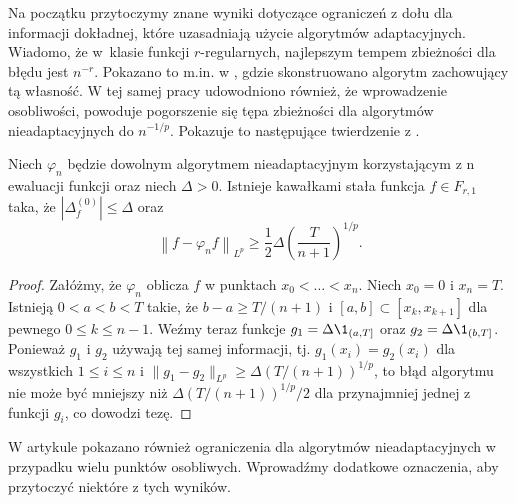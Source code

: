 \documentclass[oik, pdftex, man]{mgrwms}
\begin{document}
    Na początku przytoczymy znane wyniki dotyczące ograniczeń z dołu dla informacji dokładnej, które uzasadniają użycie algorytmów adaptacyjnych. Wiadomo, że w~klasie funkcji $r$-regularnych, najlepszym tempem zbieżności dla błędu jest $n^{-r}$. Pokazano to m.in. w \cite{PoA}, gdzie skonstruowano algorytm zachowujący tą własność. W tej samej pracy udowodniono również, że wprowadzenie osobliwości, powoduje pogorszenie się tępa zbieżności dla algorytmów nieadaptacyjnych do $n^{-1/p}$. Pokazuje to następujące twierdzenie z \cite{PoA}.

    \begin{thm}
        Niech $\varphi_{n}$ będzie dowolnym algorytmem nieadaptacyjnym korzystającym z n ewaluacji funkcji oraz niech $\Delta > 0$. Istnieje kawałkami stała funkcja $f \in F_{r, 1}$ taka, że $|\Delta_{f}^{(0)}| \leq \Delta$ oraz
        \begin{equation*}
            \left\| f - \varphi_{n}f \right\|_{L^{p}} \geq \frac{1}{2}\Delta \left( \frac{T}{n+1} \right)^{1/p}.
        \end{equation*}
    \end{thm}
    \begin{proof}
        Załóżmy, że $\varphi_{n}$ oblicza $f$ w punktach $x_{0} < \ldots < x_{n}$. Niech $x_{0} = 0$ i $x_{n} = T$. Istnieją $0 < a < b < T$ takie, że $b-a \geq T/(n+1)$ i $[a,b] \subset [x_{k}, x_{k+1}]$ dla pewnego $0 \leq k \leq n-1$. Weźmy teraz funkcje $g_{1} = \Delta\1_{(a, T]}$ oraz $g_{2} = \Delta\1_{(b, T]}$. Ponieważ $g_{1}$ i $g_{2}$ używają tej samej informacji, tj. $g_{1}(x_{i}) = g_{2}(x_{i})$ dla wszystkich $1 \leq i \leq n$ i $\| g_{1} - g_{2} \|_{L^{p}} \geq \Delta(T / (n+1))^{1/p}$, to błąd algorytmu nie może być mniejszy niż $\Delta(T/(n+1))^{1/p} / 2$ dla przynajmniej jednej z funkcji $g_{i}$, co dowodzi tezę.
    \end{proof}

    W artykule \cite{PoA} pokazano również ograniczenia dla algorytmów nieadaptacyjnych w przypadku wielu punktów osobliwych. Wprowadźmy dodatkowe oznaczenia, aby przytoczyć niektóre z tych wyników.
    
\end{document}
